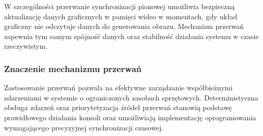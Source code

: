 \documentclass{article}
\begin{document}
W szczególności przerwanie synchronizacji pionowej umożliwia bezpieczną aktualizację danych graficznych w pamięci wideo w momentach, gdy układ graficzny nie odczytuje danych do generowania obrazu. Mechanizm przerwań zapewnia tym samym spójność danych oraz stabilność działania systemu w czasie rzeczywistym.

\subsubsection{Znaczenie mechanizmu przerwań}

Zastosowanie przerwań pozwala na efektywne zarządzanie współbieżnymi zdarzeniami w systemie o ograniczonych zasobach sprzętowych. Deterministyczna obsługa zdarzeń oraz priorytetyzacja źródeł przerwań stanowią podstawę prawidłowego działania konsoli oraz umożliwiają implementację oprogramowania wymagającego precyzyjnej synchronizacji czasowej.
\printbibliography
	
\end{document}
